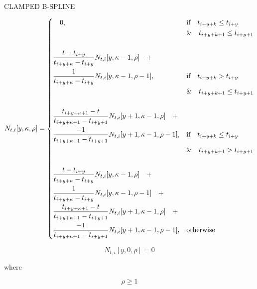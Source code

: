 \documentclass{article}
\begin{document}
 \hspace{1cm}
 
CLAMPED B-SPLINE

 \begin{equation} \label{eq:Basis function table rth derivative equation}
  N_{t,i}[y,\kappa, \rho] = \begin{dcases} \quad 0, & \text{if} \quad t_{i+y+k} \leq t_{i+y} \\ & \text{\&} \quad t_{i+y+k+1} \leq t_{i+y+1} \\\\
  \frac{t - t_{i+y}}{t_{i+y+\kappa} - t_{i+y}} N_{t,i}[y,\kappa-1,\rho] \quad + \\ 
  \frac{1}{t_{i+y+\kappa} - t_{i+y}} N_{t,i}[y,\kappa-1,\rho-1], & \text{if} \quad t_{i+y+k} > t_{i+y} \\ & \text{\&} \quad t_{i+y+k+1} \leq t_{i+y+1}\\\\
  \frac{t_{i+y+\kappa+1} - t}{t_{i+y+\kappa+1}-t_{i+y+1}} N_{t,i}[y+1 , \kappa-1, \rho] \quad + \\  \frac{-1}{t_{i+y+\kappa+1}-t_{i+y+1}} N_{t,i}[y+1 , \kappa-1, \rho-1], & \text{if} \quad t_{i+y+k} \leq t_{i+y} \\ & \text{\&} \quad t_{i+y+k+1} > t_{i+y+1} \\\\
  \frac{t - t_{i+y}}{t_{i+y+\kappa} - t_{i+y}} N_{t,i}[y,\kappa-1,\rho] \quad + \\
  \frac{1}{t_{i+y+\kappa} - t_{i+y}} N_{t,i}[y,\kappa-1,\rho-1] \quad + \\
    \frac{t_{i+y+\kappa+1} - t}{t_{i+y+\kappa+1}-t_{i+y+1}} N_{t,i}[y+1 , \kappa-1, \rho] \quad + \\  \frac{-1}{t_{i+y+\kappa+1}-t_{i+y+1}} N_{t,i}[y+1 , \kappa-1, \rho-1], & \text{otherwise}
 \end{dcases}
  \end{equation}
  
\hspace{1cm}
  
  \begin{equation}
      N_{t,i}[y,0,\rho] = 0
  \end{equation}
  
  where
  
  \begin{equation}
      \rho \geq 1
  \end{equation}
  
\hspace{1cm}
\end{document}
